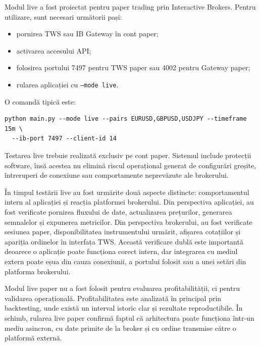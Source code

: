 Modul live a fost proiectat pentru paper trading prin Interactive Brokers. Pentru utilizare, sunt necesari următorii pași:
\begin{itemize}
    \setlength{\itemsep}{0pt}
    \setlength{\parsep}{0pt}
    \setlength{\topsep}{3pt}
    \item pornirea TWS sau IB Gateway în cont paper;
    \item activarea accesului API;
    \item folosirea portului 7497 pentru TWS paper sau 4002 pentru Gateway paper;
    \item rularea aplicației cu \texttt{--mode live}.
\end{itemize}

O comandă tipică este:

\begin{code}
\begin{verbatim}
python main.py --mode live --pairs EURUSD,GBPUSD,USDJPY --timeframe 15m \
  --ib-port 7497 --client-id 14
\end{verbatim}
\caption{Exemplu de rulare în mod live paper}
\label{code:live_run}
\end{code}

Testarea live trebuie realizată exclusiv pe cont paper. Sistemul include protecții software, însă acestea nu elimină riscul operațional generat de configurări greșite, întreruperi de conexiune sau comportamente neprevăzute ale brokerului.

În timpul testării live au fost urmărite două aspecte distincte: comportamentul intern al aplicației și reacția platformei brokerului. Din perspectiva aplicației, au fost verificate pornirea fluxului de date, actualizarea prețurilor, generarea semnalelor și expunerea metricilor. Din perspectiva brokerului, au fost verificate sesiunea paper, disponibilitatea instrumentului urmărit, afișarea cotațiilor și apariția ordinelor în interfața TWS. Această verificare dublă este importantă deoarece o aplicație poate funcționa corect intern, dar integrarea cu mediul extern poate eșua din cauza conexiunii, a portului folosit sau a unei setări din platforma brokerului.

Modul live paper nu a fost folosit pentru evaluarea profitabilității, ci pentru validarea operațională. Profitabilitatea este analizată în principal prin backtesting, unde există un interval istoric clar și rezultate reproductibile. În schimb, rularea live paper confirmă faptul că arhitectura poate funcționa într-un mediu asincron, cu date primite de la broker și cu ordine transmise către o platformă externă.

